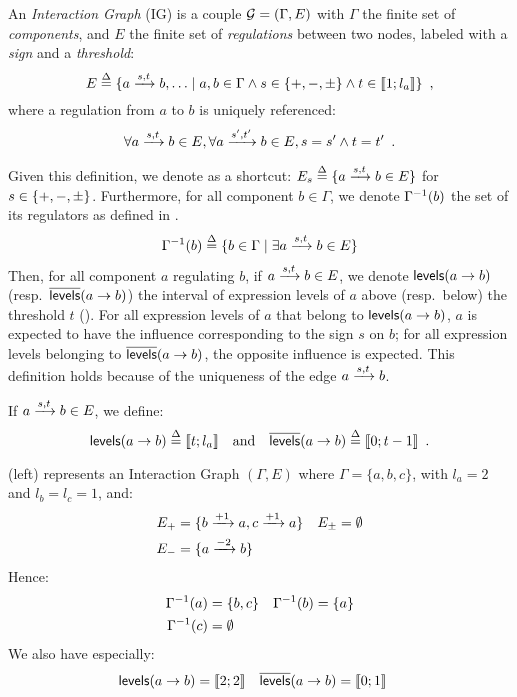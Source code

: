 \begin{definition}
\label{def:ig}
An \emph{Interaction Graph} (IG) is a couple $\mathcal{G} = (\Gamma, E)$ with $\Gamma$ the finite set of \emph{components},
and $E$ the finite set of \emph{regulations} between two nodes, labeled with a \emph{sign} and a \emph{threshold}:
$$E \stackrel{\Delta}= \{ a \xrightarrow{s, t} b, \ldots \mid a, b \in \Gamma \wedge s \in \{ +, -, \pm \} \wedge t \in \llbracket 1 ; l_a \rrbracket\} \enspace,$$
where a regulation from $a$ to $b$ is uniquely referenced:
$$\forall a \xrightarrow{s, t} b \in E, \forall a \xrightarrow{s', t'} b \in E, s = s' \wedge t = t' \enspace.$$
\end{definition}

Given this definition, we denote as a shortcut:
$E_s \stackrel{\Delta}= \{ a \xrightarrow{s, t} b \in E \}$ for $s \in \{ +, -, \pm \}$.
Furthermore, for all component $b \in \Gamma$, we denote $\Gamma^{-1}(b)$ the set of its regulators as defined in .
\begin{align}
\label{eq:grn-regulators}
  \Gamma^{-1}(b) \stackrel{\Delta}= \{ b\in\Gamma\mid \exists a \xrightarrow{s, t} b \in E \}
\end{align}
Then, for all component $a$ regulating $b$,
\ie if $a \xrightarrow{s, t} b \in E$,
we denote $\mathsf{levels}(a\rightarrow b)$ (resp.~$\overline{\mathsf{levels}}(a\rightarrow b)$) the interval of expression levels of $a$ above (resp.~below) the threshold $t$ ().
For all expression levels of $a$ that belong to $\mathsf{levels}(a\rightarrow b)$, $a$ is expected to have the influence corresponding to the sign $s$ on $b$;
for all expression levels belonging to $\overline{\mathsf{levels}}(a\rightarrow b)$, the opposite influence is expected.
This definition holds because of the uniqueness of the edge $a \xrightarrow{s, t} b$.

\begin{definition}\label{def:levels}
If $a \xrightarrow{s, t} b \in E$, we define:
$$\mathsf{levels}(a\rightarrow b) \stackrel{\Delta}= \llbracket t ; l_a \rrbracket \quad \text{and} \quad \overline{\mathsf{levels}}(a\rightarrow b) \stackrel{\Delta}= \llbracket 0 ; t-1 \rrbracket \enspace.$$
\end{definition}

\begin{example}
(left) represents an Interaction Graph $(\Gamma,E)$ where
$\Gamma = \{a, b, c\}$, with $l_a = 2$ and $l_b = l_c = 1$,
and:
\begin{align*}
  E_+ &= \{b \xrightarrow{+ 1} a, c \xrightarrow{+ 1} a\} &
  E_\pm &= \emptyset \\
  E_- &= \{a \xrightarrow{- 2} b\}
\end{align*}
Hence:
\begin{align*}
  \Gamma^{-1}(a) &= \{ b, c \} &
  \Gamma^{-1}(b) &= \{ a \} \\
  \Gamma^{-1}(c) &= \emptyset
\end{align*}
We also have especially:
\begin{align*}
  \mathsf{levels}(a\rightarrow b) &= \llbracket 2 ; 2 \rrbracket & \overline{\mathsf{levels}}(a\rightarrow b) &= \llbracket 0 ; 1 \rrbracket
\end{align*}
\end{example}

